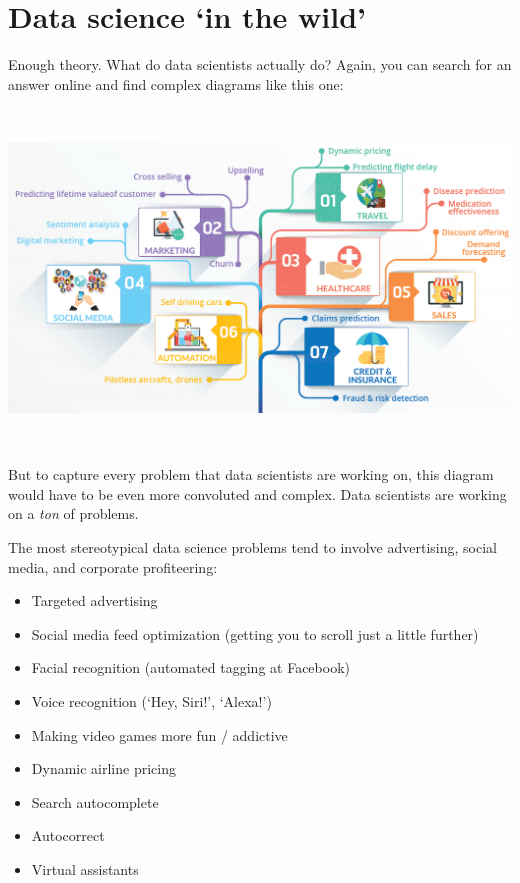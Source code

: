 \documentclass[]{book}
\providecommand{\tightlist}{%
  \setlength{\itemsep}{0pt}\setlength{\parskip}{0pt}}
\begin{document}
\hypertarget{data-science-in-the-wild}{%
\section*{Data science `in the wild'}\label{data-science-in-the-wild}}

Enough theory. What do data scientists actually do? Again, you can search for an answer online and find complex diagrams like this one:

~

\includegraphics{img/venn4.png}

~

But to capture every problem that data scientists are working on, this diagram would have to be even more convoluted and complex.
Data scientists are working on a \emph{ton} of problems.

The most stereotypical data science problems tend to involve advertising, social media, and corporate profiteering:

\begin{itemize}
\tightlist
\item
  Targeted advertising\\
\item
  Social media feed optimization (getting you to scroll just a little further)
\item
  Facial recognition (automated tagging at Facebook)
\item
  Voice recognition (`Hey, Siri!', `Alexa!')
\item
  Making video games more fun / addictive\\
\item
  Dynamic airline pricing\\
\item
  Search autocomplete\\
\item
  Autocorrect\\
\item
  Virtual assistants
\end{itemize}
\end{document}
